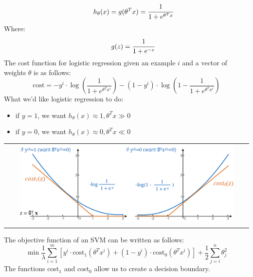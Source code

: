 \begin{equation} \tag*{}
    h_\theta(x) = g(\theta^Tx) = \cfrac{1}{1+e^{\theta^Tx}}
\end{equation}
Where:
\begin{equation} \tag*{}
    g(z) = \cfrac{1}{1+e^{-z}}
\end{equation}
The cost function for logistic regression given an example $i$ and a vector of weights $\theta$ is as follows:
\begin{equation} \tag*{}
    \text{cost} = -y^i \cdot \log(\frac{1}{1+e^{\theta^Tx^i}}) - (1-y^i) \cdot \log(1-\frac{1}{1+e^{\theta^Tx^i}})
\end{equation}
What we'd like logistic regression to do:
\begin{itemize}
    \item if $y = 1$, we want $h_\theta(x) \approx 1, \theta^Tx \gg 0$
    \item if $y = 0$, we want $h_\theta(x) \approx 0, \theta^Tx \ll 0$
\end{itemize}
\begin{center}
    \begin{tabular}{c}
        \\ \includegraphics[width=0.9\textwidth]{images/SVM1.png} \\ \\
    \end{tabular}
\end{center}
The objective function of an SVM can be written as follows:
\begin{equation} \tag*{}
    \min \frac{1}{\lambda} \sum^m_{i=1} [y^i \cdot \text{cost}_1(\theta^Tx^i) + (1 - y^i) \cdot \text{cost}_0(\theta^Tx^i)] + \frac{1}{2} \sum^n_{j=i}\theta^2_j
\end{equation}
The functions cost$_1$ and cost$_0$ allow us to create a decision boundary.

\newpage